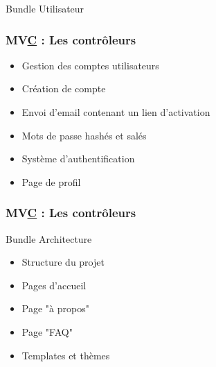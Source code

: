 
\begin{frame}
\begin{block}{Bundle Utilisateur}
\frametitle{MV\underline{C} : Les contrôleurs}
\begin{itemize}
\item Gestion des comptes utilisateurs
\item Création de compte
\item Envoi d'email contenant un lien d'activation
\item Mots de passe hashés et salés
\item Système d'authentification
\item Page de profil 
\end{itemize}
\end{block}
\end{frame}


\begin{frame}
  \frametitle{MV\underline{C} : Les contrôleurs}
  \begin{block}{Bundle Architecture}
  \begin{itemize}
  \item Structure du projet	
  \item Pages d'accueil
  \item Page "à propos"
  \item Page "FAQ"
  \item Templates et thèmes
  \end{itemize}
  \end{block}   
  \end{frame}
